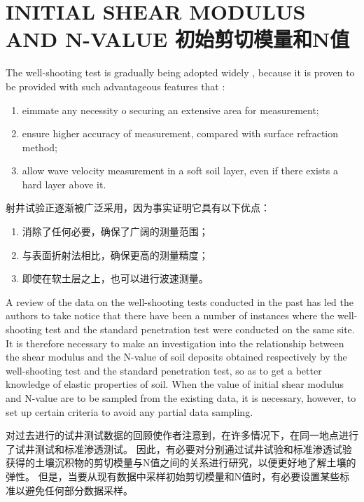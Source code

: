 \section*{INITIAL SHEAR MODULUS AND N-VALUE 初始剪切模量和N值}

\begin{paracol}{2}
    
    The well-shooting test is gradually being adopted widely , because it is proven to be provided with such advantageous features that : 
    \begin{enumerate}
        \item eimmate any necessity o securing an extensive area for measurement;
        \item ensure higher accuracy of measurement, compared with surface refraction method;
        \item allow wave velocity measurement in a soft soil layer, even if there exists a hard layer above it.
    \end{enumerate}

    \switchcolumn

    射井试验正逐渐被广泛采用，因为事实证明它具有以下优点：
    \begin{enumerate}
        \item 消除了任何必要，确保了广阔的测量范围；
        \item 与表面折射法相比，确保更高的测量精度；
        \item 即使在软土层之上，也可以进行波速测量。
    \end{enumerate}

    \switchcolumn*

    A review of the data on the well-shooting tests conducted in the past has led the authors to take notice that there have been a number of instances where the well-shooting test and the standard penetration test were conducted on the same site. It is therefore necessary to make an investigation into the relationship between the shear modulus and the N-value of soil deposits obtained respectively by the well-shooting test and the standard penetration test, so as to get a better knowledge of elastic properties of soil. When the value of initial shear modulus and N-value are to be sampled from the existing data, it is necessary, however, to set up certain criteria to avoid any partial data sampling.

    \switchcolumn

    对过去进行的试井测试数据的回顾使作者注意到，在许多情况下，在同一地点进行了试井测试和标准渗透测试。 因此，有必要对分别通过试井试验和标准渗透试验获得的土壤沉积物的剪切模量与N值之间的关系进行研究，以便更好地了解土壤的弹性。 但是，当要从现有数据中采样初始剪切模量和N值时，有必要设置某些标准以避免任何部分数据采样。

\end{paracol}

